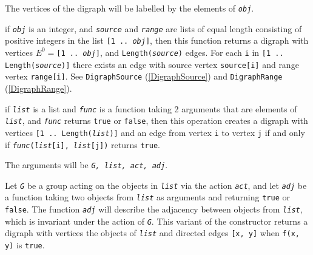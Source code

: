\documentclass[a4paper,11pt]{report}
\begin{document}
{{{\begin{description}
 The vertices of the digraph will be labelled by the elements of \mbox{\texttt{\mdseries\slshape obj}}. 
\item[{for an integer, and two lists}]  if \mbox{\texttt{\mdseries\slshape obj}} is an integer, and \mbox{\texttt{\mdseries\slshape source}} and \mbox{\texttt{\mdseries\slshape range}} are lists of equal length consisting of positive integers in the list \texttt{[1 .. \mbox{\texttt{\mdseries\slshape obj}}]}, then this function returns a digraph with vertices $E ^ 0 = $\texttt{[1 .. \mbox{\texttt{\mdseries\slshape obj}}]}, and \texttt{Length(\mbox{\texttt{\mdseries\slshape source}})} edges. For each \texttt{i} in \texttt{[1 .. Length(\mbox{\texttt{\mdseries\slshape source}})]} there exists an edge with source vertex \texttt{source[i]} and range vertex \texttt{range[i]}. See \texttt{DigraphSource} (\ref{DigraphSource}) and \texttt{DigraphRange} (\ref{DigraphRange}). 
\item[{for a list and a function}]  if \mbox{\texttt{\mdseries\slshape list}} is a list and \mbox{\texttt{\mdseries\slshape func}} is a function taking 2 arguments that are elements of \mbox{\texttt{\mdseries\slshape list}}, and \mbox{\texttt{\mdseries\slshape func}} returns \texttt{true} or \texttt{false}, then this operation creates a digraph with vertices \texttt{[1 .. Length(\mbox{\texttt{\mdseries\slshape list}})]} and an edge from vertex \texttt{i} to vertex \texttt{j} if and only if \texttt{\mbox{\texttt{\mdseries\slshape func}}(\mbox{\texttt{\mdseries\slshape list}}[i], \mbox{\texttt{\mdseries\slshape list}}[j])} returns \texttt{true}. 
\item[{for a group, a list, and two functions}]  The arguments will be \mbox{\texttt{\mdseries\slshape G, list, act, adj}}. 

 Let \mbox{\texttt{\mdseries\slshape G}} be a group acting on the objects in \mbox{\texttt{\mdseries\slshape list}} via the action \mbox{\texttt{\mdseries\slshape act}}, and let \mbox{\texttt{\mdseries\slshape adj}} be a function taking two objects from \mbox{\texttt{\mdseries\slshape list}} as arguments and returning \texttt{true} or \texttt{false}. The function \mbox{\texttt{\mdseries\slshape adj}} will describe the adjacency between objects from \mbox{\texttt{\mdseries\slshape list}}, which is invariant under the action of \mbox{\texttt{\mdseries\slshape G}}. This variant of the constructor returns a digraph with vertices the objects
of \mbox{\texttt{\mdseries\slshape list}} and directed edges \texttt{[x, y]} when \texttt{f(x, y)} is \texttt{true}. 


\end{description}}}}
\end{document}
